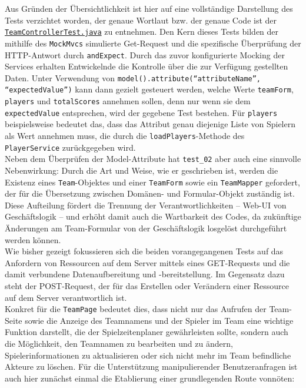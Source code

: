 Aus Gründen der Übersichtlichkeit ist hier auf eine vollständige Darstellung des 
Tests verzichtet worden, der genaue Wortlaut bzw. der genaue Code ist der 
\href{https://github.com/FlorianOhmes/bat_spielzeitenplaner/blob/main/spielzeitenplaner/src/test/java/de/bathesis/spielzeitenplaner/web/TeamControllerTest.java}{\texttt{TeamControllerTest.java}} 
zu entnehmen. Den Kern dieses Tests bilden der mithilfe des \texttt{MockMvcs} 
simulierte Get-Request und die spezifische Überprüfung der HTTP-Antwort durch 
\texttt{andExpect}. Durch das zuvor konfigurierte Mocking der Services 
erhalten Entwickelnde die Kontrolle über die zur Verfügung gestellten Daten. Unter 
Verwendung von \texttt{model().attribute(``attributeName'', ``expectedValue'')} 
kann dann gezielt gesteuert werden, welche Werte \texttt{teamForm}, 
\texttt{players} und \texttt{totalScores} annehmen sollen, denn nur wenn sie dem 
\texttt{expectedValue} entsprechen, wird der gegebene Test bestehen. Für 
\texttt{players} beispielsweise bedeutet das, dass das Attribut genau diejenige 
Liste von Spielern als Wert annehmen muss, die durch die 
\texttt{loadPlayers}-Methode des \texttt{PlayerService} zurückgegeben wird. \\ 
Neben dem Überprüfen der Model-Attribute hat \texttt{test\_02} aber auch eine 
sinnvolle Nebenwirkung: Durch die Art und Weise, wie er geschrieben ist, werden die 
Existenz eines \texttt{Team}-Objektes und einer \texttt{TeamForm} sowie ein 
\texttt{TeamMapper} gefordert, der für die Übersetzung zwischen Domänen- und 
Formular-Objekt zuständig ist. Diese Aufteilung fördert die Trennung der 
Verantwortlichkeiten -- Web-UI von Geschäftslogik -- und erhöht damit auch die 
Wartbarkeit des Codes, da zukünftige Änderungen am Team-Formular von der 
Geschäftslogik losgelöst durchgeführt werden können. \\ 
Wie bisher gezeigt fokussieren sich die beiden vorangegangenen Tests auf das 
Anfordern von Ressourcen auf dem Server mittels eines GET-Requests und die damit 
verbundene Datenaufbereitung und -bereitstellung. Im Gegensatz dazu steht der 
POST-Request, der für das Erstellen oder Verändern einer Ressource auf dem Server 
verantwortlich ist. \\ 
Konkret für die \texttt{TeamPage} bedeutet dies, dass nicht nur das Aufrufen der 
Team-Seite sowie die Anzeige des Teamnamens und der Spieler im Team eine wichtige 
Funktion darstellt, die der Spielzeitenplaner gewährleisten sollte, sondern auch 
die Möglichkeit, den Teamnamen zu bearbeiten und zu ändern, Spielerinformationen zu 
aktualisieren oder sich nicht mehr im Team befindliche Akteure zu löschen. Für die 
Unterstützung manipulierender Benutzeranfragen ist auch hier zunächst einmal die 
Etablierung einer grundlegenden Route vonnöten: 

